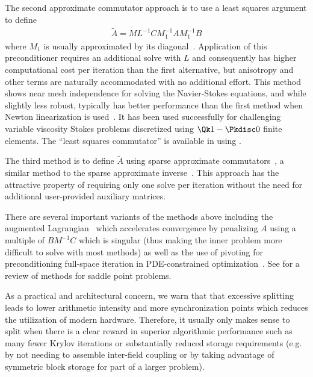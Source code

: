The second approximate commutator approach is to use a least squares argument to define
\begin{align*}
  \tilde A = M L^{-1} C M_1^{-1} A M_1^{-1} B
\end{align*}
where $M_1$ is usually approximated by its diagonal~\citep{elman1999bfbt,elman2006bpb}.
Application of this preconditioner requires an additional solve with $L$ and consequently has higher computational cost per iteration than the first alternative, but anisotropy and other terms are naturally accommodated with no additional effort.
This method shows near mesh independence for solving the Navier-Stokes equations, and while slightly less robust, typically has better performance than the first method when Newton linearization is used~\citep{elman2008tcp}.
It has been used successfully for challenging variable viscosity Stokes problems discretized using $\Qk 1-\Pkdisc 0$ finite elements.
The ``least squares commutator'' is available in {\PETSc} using .

The third method is to define $\tilde A$ using sparse approximate commutators~\citep{elman2006bpb}, a similar method to the sparse approximate inverse~\citep{grote1997parallel}.
This approach has the attractive property of requiring only one solve per iteration without the need for additional user-provided auxiliary matrices.

There are several important variants of the methods above including the augmented Lagrangian~\citep{awanou2005convergence,dohrmann2006pbp,deniet2007tps} which accelerates convergence by penalizing $A$ using a multiple of $B M^{-1} C$ which is singular (thus making the inner problem more difficult to solve with most methods) as well as the use of pivoting for preconditioning full-space iteration in PDE-constrained optimization~\citep{biros2005pln1,biros2005pln2,akcelik2006parallel}.
See \citet{benzi2005nss} for a review of methods for saddle point problems.

As a practical and architectural concern, we warn that that excessive splitting leads to lower arithmetic intensity and more synchronization points which reduces the utilization of modern hardware.
Therefore, it usually only makes sense to split when there is a clear reward in superior algorithmic performance such as many fewer Krylov iterations or substantially reduced storage requirements (e.g. by not needing to assemble inter-field coupling or by taking advantage of symmetric block storage for part of a larger problem).

